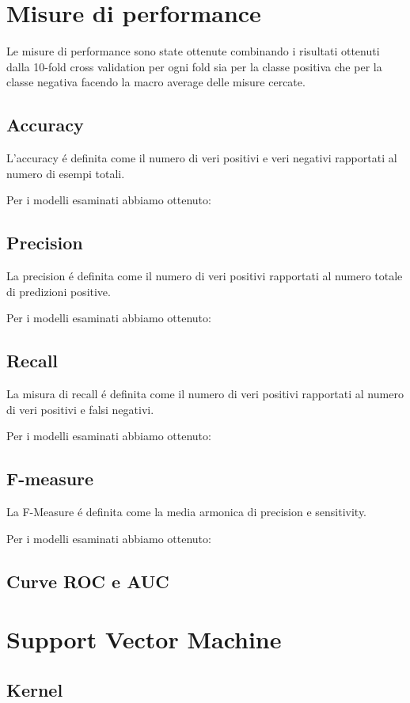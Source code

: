 \section{Misure di performance}
Le misure di performance sono state ottenute combinando i risultati
ottenuti dalla 10-fold cross validation per ogni fold sia per la
classe positiva che per la classe negativa facendo la macro average
delle misure cercate.

\subsection{Accuracy}
L'accuracy é definita come il numero di veri positivi e veri negativi
rapportati al numero di esempi totali.

Per i modelli esaminati abbiamo ottenuto:

\subsection{Precision}
La precision é definita come il numero di veri positivi rapportati al
numero totale di predizioni positive.

Per i modelli esaminati abbiamo ottenuto:
\subsection{Recall}
La misura di recall é definita come il numero di veri positivi
rapportati al numero di veri positivi e falsi negativi.

Per i modelli esaminati abbiamo ottenuto:
\subsection{F-measure}
La F-Measure é definita come la media armonica di precision e
sensitivity.

Per i modelli esaminati abbiamo ottenuto:
\subsection{Curve ROC e AUC}

\section{Support Vector Machine}
\subsection{Kernel}

